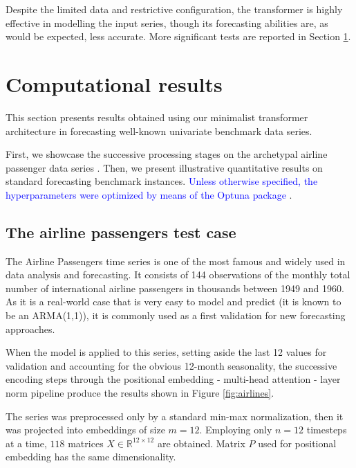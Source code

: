 \documentclass[algorithms,article,submit,pdftex,moreauthors]{Definitions/mdpi}
\begin{document}
Despite the limited data and restrictive configuration, the transformer is highly effective in modelling the input series, though its forecasting abilities are, as would be expected, less accurate. More significant tests are reported in Section \ref{sec:results}.

\section{Computational results} \label{sec:results}

This section presents results obtained using our minimalist transformer architecture in forecasting well-known univariate benchmark data series.

First, we showcase the successive processing stages on the archetypal airline passenger data series \citep{BJ70}. Then, we present illustrative quantitative results on standard forecasting benchmark instances. \textcolor{blue}{Unless otherwise specified, the hyperparameters were optimized by means of the Optuna package \cite{ASY19}}.

\subsection{The airline passengers test case} \label{subsec:airlines}

The Airline Passengers time series is one of the most famous and widely used in data analysis and forecasting. It consists of 144 observations of the monthly total number of international airline passengers in thousands between 1949 and 1960. As it is a real-world case that is very easy to model and predict (it is known to be an ARMA(1,1)), it is commonly used as a first validation for new forecasting approaches.

When the model is applied to this series, setting aside the last 12 values for validation and accounting for the obvious 12-month seasonality, the successive encoding steps through the positional embedding - multi-head attention - layer norm pipeline produce the results shown in Figure \ref{fig:airlines}.

The series was preprocessed only by a standard min-max normalization, then it was projected into embeddings of size $m = 12$. Employing only $n = 12$ timesteps at a time, $118$ matrices $X \in \mathbb{R}^{12 \times 12}$ are obtained. Matrix $P$ used for positional embedding has the same dimensionality.
\end{document}
